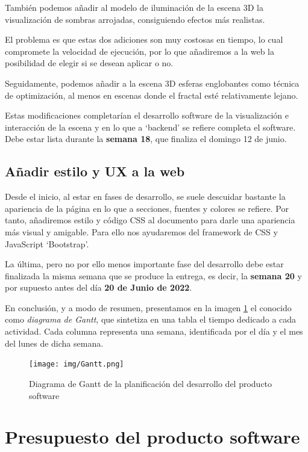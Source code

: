 También podemos añadir al modelo de iluminación de la escena 3D la visualización de sombras arrojadas, consiguiendo efectos más realistas.

El problema es que estas dos adiciones son muy costosas en tiempo, lo cual compromete la velocidad de ejecución, por lo que añadiremos a la web la posibilidad de elegir si se desean aplicar o no. 

Seguidamente, podemos añadir a la escena 3D esferas englobantes como técnica de optimización, al menos en escenas donde el fractal esté relativamente lejano.

Estas modificaciones completarían el desarrollo software de la visualización e interacción de la escena y en lo que a `backend' se refiere completa el software. Debe estar lista durante la \textbf{semana 18}, que finaliza el domingo 12 de junio.

\subsection{Añadir estilo y UX a la web}

Desde el inicio, al estar en fases de desarrollo, se suele descuidar bastante la apariencia de la página en lo que a secciones, fuentes y colores se refiere. Por tanto, añadiremos estilo y código CSS al documento para darle una apariencia más visual y amigable. Para ello nos ayudaremos del framework de CSS y JavaScript `Bootstrap'.

La última, pero no por ello menos importante fase del desarrollo debe estar finalizada la misma semana que se produce la entrega, es decir, la \textbf{semana 20} y por supuesto antes del día \textbf{20 de Junio de 2022}.

\vspace{1cm}

En conclusión, y a modo de resumen, presentamos en la imagen \ref{fig:Gantt} el conocido como \textit{diagrama de Gantt}, que sintetiza en una tabla el tiempo dedicado a cada actividad. Cada columna representa una semana, identificada por el día y el mes del lunes de dicha semana.

\begin{figure} [ht]
    \centering
    \texttt{[image: img/Gantt.png]}
    \caption{Diagrama de Gantt de la planificación del desarrollo del producto software}
    \label{fig:Gantt}
\end{figure}

\newpage

\section{Presupuesto del producto software}

